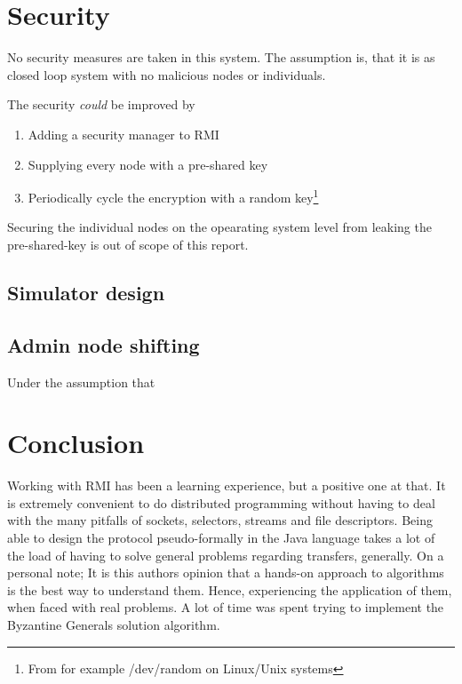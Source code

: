\documentclass[10pt,a4paper]{article}
\begin{document}

\section{Security}
No security measures are taken in this system. The assumption is, that it is as closed loop system with no malicious nodes or individuals.

The security \emph{could} be improved by 
\begin{enumerate}
\item Adding a security manager to RMI
\item Supplying every node with a pre-shared key
\item Periodically cycle the encryption with a random key\footnote{From for example /dev/random on Linux/Unix systems}
\end{enumerate}
Securing the individual nodes on the opearating system level from leaking the pre-shared-key is out of scope of this report.

\subsection{Simulator design}

\subsection{Admin node shifting}
Under the assumption that 

\section{Conclusion}
Working with RMI has been a learning experience, but a positive one at that. It is extremely convenient to do distributed programming without having to deal with the many pitfalls of sockets, selectors, streams and file descriptors. Being able to design the protocol pseudo-formally in the Java language takes a lot of the load of having to solve general problems regarding transfers, generally.
On a personal note; It is this authors opinion that a hands-on approach to algorithms is the best way to understand them. Hence, experiencing the application of them, when faced with real problems.
A lot of time was spent trying to implement the Byzantine Generals solution algorithm.
\end{document}
